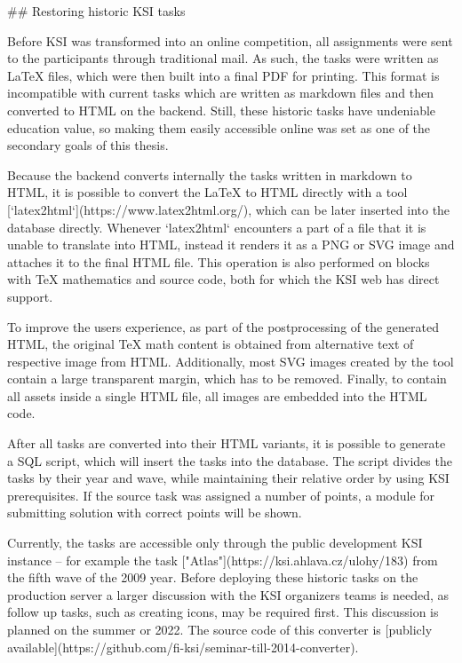 \documentclass[
  digital, %
  oneside, %
  lof,     %
  nolot,     %
]{fithesis4}
\begin{document}
{## Restoring historic KSI tasks

Before KSI was transformed into an online competition, all assignments were sent to the participants through traditional mail. As such, the tasks were written as \LaTeX{} files, which were then built into a final PDF for printing. This format is incompatible with current tasks which are written as markdown files and then converted to HTML on the backend. Still, these historic tasks have undeniable education value, so making them easily accessible online	was set as one of the secondary goals of this thesis.

Because the backend converts internally the tasks written in markdown to HTML, it is possible to convert the \LaTeX{} to HTML directly with a tool [`latex2html`](https://www.latex2html.org/), which can be later inserted into the database directly. Whenever `latex2html` encounters a part of a file that it is unable to translate into HTML, instead it renders it as a PNG or SVG image and attaches it to the final HTML file. This operation is also performed on blocks with TeX mathematics and source code, both for which the KSI web has direct support.

To improve the users experience, as part of the postprocessing of the generated HTML, the original TeX math content is obtained from alternative text of respective image from HTML. Additionally, most SVG images created by the tool contain a large transparent margin, which has to be removed. Finally, to contain all assets inside a single HTML file, all images are embedded into the HTML code.

After all tasks are converted into their HTML variants, it is possible to generate a SQL script, which will insert the tasks into the database. The script divides the tasks by their year and wave, while maintaining their relative order by using KSI prerequisites. If the source task was assigned a number of points, a module for submitting solution with correct points will be shown.

Currently, the tasks are accessible only through the public development KSI instance -- for example the task ["Atlas"](https://ksi.ahlava.cz/ulohy/183) from the fifth wave of the 2009 year. Before deploying these historic tasks on the production server a larger discussion with the KSI organizers teams is needed, as follow up tasks, such as creating icons, may be required first. This discussion is planned on the summer or 2022. The source code of this converter is [publicly available](https://github.com/fi-ksi/seminar-till-2014-converter).

}
\end{document}
